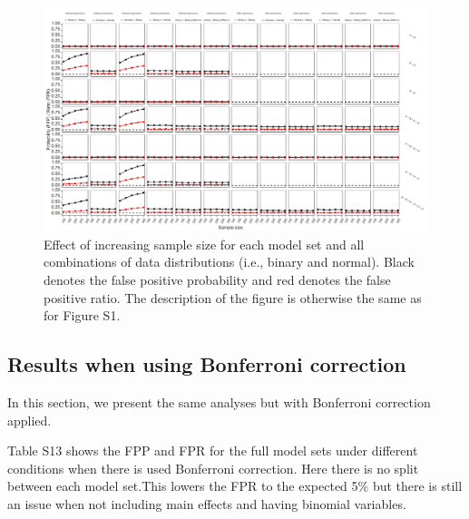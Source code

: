 \begin{figure}[hbt!]
\includegraphics{R/Analysis/Result/Figures/Figure1DSI.jpeg}
\centering
\caption{Effect of increasing sample size for each model set and all combinations of data distributions (i.e., binary and normal). Black denotes the false positive probability and red denotes the false positive ratio. The description of the figure is otherwise the same as for Figure S1.}
\label{fig:mainfigure}
\end{figure}

\clearpage
\subsection{Results when using Bonferroni correction}
In this section, we present the same analyses but with Bonferroni correction applied. 

Table S13 shows the FPP and FPR for the full model sets under different conditions when there is used Bonferroni correction. Here there is no split between each model set.This lowers the FPR to the expected 5\% but there is still an issue when not including main effects and having binomial variables. 




